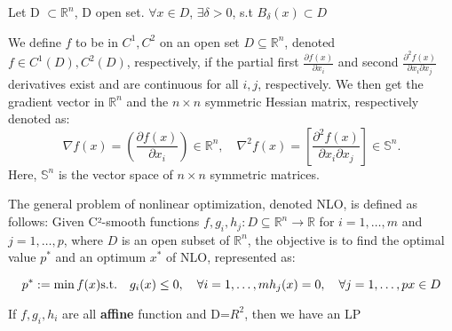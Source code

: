 \begin{definition}
    Let D $\subset \mathbb{R}^n$, D open set. $\forall x \in D$, $\exists \delta >0$, s.t $B_{\delta}(x)\subset D$
\end{definition}

\begin{definition}[differ]
    We define \(f\) to be in \(C^1, C^2\) on an open set \(D \subseteq \mathbb{R}^n\), denoted \(f \in C^1(D), C^2(D)\), respectively, if the partial first \(\frac{\partial f(x)}{\partial x_i}\) and second \(\frac{\partial^2 f(x)}{\partial x_i \partial x_j}\) derivatives exist and are continuous for all \(i, j\), respectively. We then get the gradient vector in \(\mathbb{R}^n\) and the \(n \times n\) symmetric Hessian matrix, respectively denoted as:
\[
\nabla f(x) = \left( \frac{\partial f(x)}{\partial x_i} \right) \in \mathbb{R}^n, \quad \nabla^2 f(x) = \left[ \frac{\partial^2 f(x)}{\partial x_i \partial x_j} \right] \in \mathbb{S}^n.
\]
Here, \(\mathbb{S}^n\) is the vector space of \(n \times n\) symmetric matrices.

\end{definition}


\begin{definition}
    The general problem of nonlinear optimization, denoted NLO, is defined as follows: Given C²-smooth functions
\(f, g_i, h_j : D \subseteq \mathbb{R}^n \rightarrow \mathbb{R}\) for \(i = 1, \ldots, m\) and \(j = 1, \ldots, p\), where \(D\) is an open subset of \(\mathbb{R}^n\), the objective is to find the optimal value \(p^*\) and an optimum \(x^*\) of NLO, represented as:

\[
p^* := \min f(x) \\
\text{s.t.} \quad g_i(x) \leq 0, \quad \forall i = 1, \ldots, m \\
h_j(x) = 0, \quad \forall j = 1, \ldots, p \\
x \in D
\]

If $f,g_i,h_i$ are all \textbf{affine} function and D=$R^2$, then we have an LP
\end{definition}

